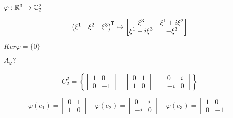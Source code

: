 \begin{example}
    $\varphi : \mathbb{R}^3 \to \mathbb{C}_2^2$

    $$\begin{pmatrix}
            \xi^1 & \xi^2 & \xi^3
        \end{pmatrix}^{\mkern-1.5mu\mathsf{T}} \mapsto \begin{bmatrix}
            \xi^3          & \xi^1+i\xi^2 \\
            \xi^1 - i\xi^3 & -\xi^3
        \end{bmatrix}$$

    $Ker \varphi = \{0\}$

    $A_\varphi?$

    $$C_2^2 = \left\{
        \begin{bmatrix}
            1 & 0  \\
            0 & -1
        \end{bmatrix} \quad \begin{bmatrix}
            0 & 1 \\
            1 & 0
        \end{bmatrix} \quad \begin{bmatrix}
            0  & i \\
            -i & 0
        \end{bmatrix}
        \right\}$$

    $$\varphi(e_1)=\begin{bmatrix}
            0 & 1 \\
            1 & 0
        \end{bmatrix} \quad \varphi(e_2) = \begin{bmatrix}
            0  & i \\
            -i & 0
        \end{bmatrix}\quad \varphi(e_3) = \begin{bmatrix}
            1 & 0  \\
            0 & -1
        \end{bmatrix}$$
\end{example}


